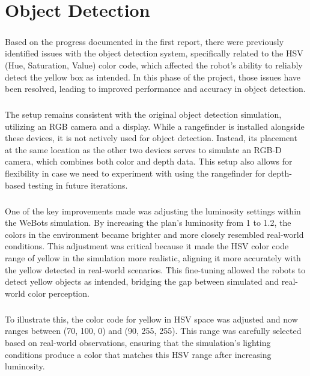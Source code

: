 \chapter{Object Detection}

\paragraph*{}
Based on the progress documented in the first report, there were previously identified issues with the object detection system, specifically related to the HSV (Hue, Saturation, Value) color code, which affected the robot's ability to reliably detect the yellow box as intended. In this phase of the project, those issues have been resolved, leading to improved performance and accuracy in object detection.

\paragraph*{}
The setup remains consistent with the original object detection simulation, utilizing an RGB camera and a display. While a rangefinder is installed alongside these devices, it is not actively used for object detection. Instead, its placement at the same location as the other two devices serves to simulate an RGB-D camera, which combines both color and depth data. This setup also allows for flexibility in case we need to experiment with using the rangefinder for depth-based testing in future iterations.

\paragraph*{}
One of the key improvements made was adjusting the luminosity settings within the WeBots simulation. By increasing the plan's luminosity from 1 to 1.2, the colors in the environment became brighter and more closely resembled real-world conditions. This adjustment was critical because it made the HSV color code range of yellow in the simulation more realistic, aligning it more accurately with the yellow detected in real-world scenarios. This fine-tuning allowed the robots to detect yellow objects as intended, bridging the gap between simulated and real-world color perception.

\paragraph*{}
To illustrate this, the color code for yellow in HSV space was adjusted and now ranges between (70, 100, 0) and (90, 255, 255). This range was carefully selected based on real-world observations, ensuring that the simulation's lighting conditions produce a color that matches this HSV range after increasing luminosity.

